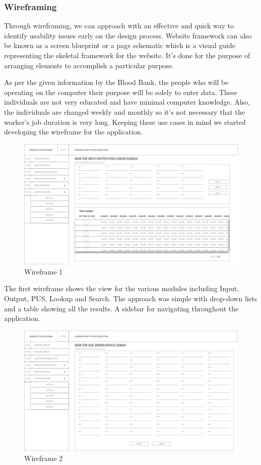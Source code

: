 \documentclass[BTech]{srmuthesis}
\begin{document}
\subsubsection{Wireframing}
Through wireframing, we can approach with an effective and quick way to identify usability issues early on the design process. Website framework can also be known as a screen blueprint or a page schematic which is a visual guide representing the skeletal framework for the website. It's done for the purpose of arranging elements to accomplish a particular purpose.\par
As per the given information by the Blood Bank, the people who will be operating on the computer their purpose will be solely to enter data. These individuals are not very educated and have minimal computer knowledge. Also, the individuals are changed weekly and monthly so it's not necessary that the worker's job duration is very long. Keeping these use cases in mind we started developing the wireframe for the application.\par \cite{wiki_wireframe}
\begin{figure}[h!]
	\centering
	\includegraphics[scale=0.2]{wireframe1.png}
	\caption{Wireframe 1}
\end{figure}
The first wireframe shows the view for the various modules including Input, Output, \ac{PUS}, Lookup and Search. The approach was simple with drop-down lists and a table showing all the results. A sidebar for navigating throughout the application.\par
\begin{figure}[h!]
	\centering
	\includegraphics[scale=0.2]{wireframe2.png}
	\caption{Wireframe 2}
\end{figure}
\end{document}
